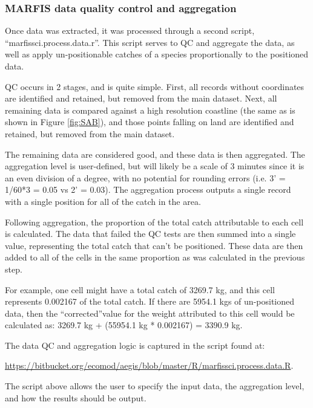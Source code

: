 \documentclass[letterpaper,portrait,11pt]{scrartcl}
\numberwithin{equation}{section}    %
\numberwithin{figure}{section}    %
\numberwithin{table}{section}       %
\begin{document}

\subsubsection{MARFIS data quality control and aggregation}
Once data was extracted, it was processed through a second script, \textquotedblleft marfissci.process.data.r\textquotedblright.  This script serves to QC and aggregate the data, as well as apply un-positionable catches of a species proportionally to the positioned data.

QC occurs in 2 stages, and is quite simple.  First, all records without coordinates are identified and retained, but removed from the main dataset.  Next, all remaining data is compared against a high resolution coastline (the same as is shown in Figure \ref{fig:SAB}), and those points falling on land are identified and retained, but removed from the main dataset.

The remaining data are considered good, and these data is then aggregated.  The aggregation level is user-defined, but will likely be a scale of 3 minutes since it is an even division of a degree, with no potential for rounding errors (i.e. 3' = 1/60*3 = 0.05 vs 2' = 0.03).  The aggregation process outputs a single record with a single position for all of the catch in the area.

Following aggregation, the proportion of the total catch attributable to each cell is calculated.  The data that failed the QC tests are then summed into a single value, representing the total catch that can\textquoteright t be positioned.  These data are then added to all of the cells in the same proportion as was calculated in the previous step.

For example, one cell might have a total catch of 3269.7 kg, and this cell represents 0.002167 of the total catch.  If there are 5954.1 kgs of un-positioned data, then the \textquotedblleft corrected\textquotedblright value for the weight attributed to this cell would be calculated as:
3269.7 kg + (55954.1 kg * 0.002167) = 3390.9 kg.


The data QC and aggregation logic is captured in the script found at: 

\url{https://bitbucket.org/ecomod/aegis/blob/master/R/marfissci.process.data.R}.

The script above allows the user to specify the input data, the aggregation level, and how the results should be output.
\end{document}
